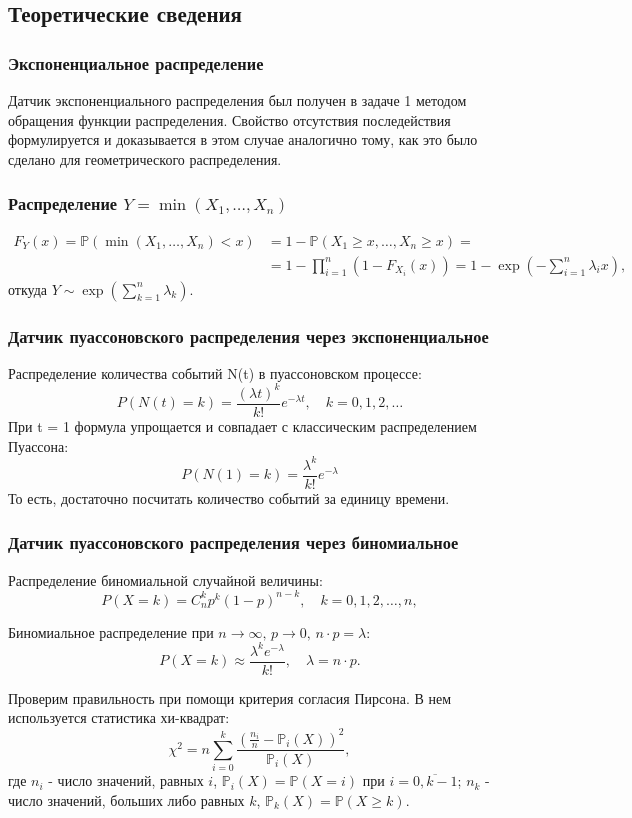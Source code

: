 \documentclass[11pt]{article}
\renewcommand{\ge}{\geqslant}
\begin{document}
\subsection{Теоретические сведения}
\subsubsection{Экспоненциальное распределение}
Датчик экспоненциального распределения был получен в задаче 1 методом обращения функции распределения. Свойство отсутствия последействия формулируется и доказывается в этом случае аналогично тому, как это было сделано для геометрического
распределения.
\subsubsection{Распределение $Y = \min(X_1, \dots, X_n)$}
\begin{equation*}
\begin{aligned}
F_Y(x) = \mathbb{P}(\min(X_1, \dots, X_n) < x) &= 1 - \mathbb{P}(X_1 \ge x, \dots, X_n \ge x) = \\
&= 1 - \prod_{i=1}^n (1 - F_{X_i}(x)) = 1 - \exp \left( -\sum_{i=1}^n \lambda_i x \right),
\end{aligned}
\end{equation*}
откуда $Y \sim \exp \left( \sum_{k=1}^n \lambda_k \right)$.
\subsubsection{Датчик пуассоновского распределения через экспоненциальное}
Распределение количества событий N(t) в пуассоновском процессе:
$$
P(N(t) = k) = \frac{(\lambda t)^k}{k!} e^{-\lambda t}, \quad k = 0, 1, 2, \dots
$$
При t = 1 формула упрощается и совпадает с классическим распределением Пуассона:
$$
P(N(1) = k) = \frac{\lambda^k}{k!} e^{-\lambda}
$$
То есть, достаточно посчитать количество событий за единицу времени.
\subsubsection{Датчик пуассоновского распределения через биномиальное}
Распределение биномиальной случайной величины:
$$
P(X = k) = C_n^k p^k (1 - p)^{n-k}, \quad k = 0, 1, 2, \dots, n,
$$

Биномиальное распределение при $ n \to \infty, \, p \to 0, \, n \cdot p = \lambda $:
$$
P(X = k) \approx \frac{\lambda^k e^{-\lambda}}{k!}, \quad \lambda = n \cdot p.
$$

Проверим правильность при помощи критерия согласия Пирсона. В нем используется статистика хи-квадрат:
$$
\chi^2 = n \sum_{i = 0}^k \frac{(\frac{n_i}{n} - \mathbb{P}_i(X))^2}{\mathbb{P}_i(X)},
$$
где $n_i$ - число значений, равных $i$, $\mathbb{P}_i(X) = \mathbb{P}(X = i)$ при $i = \overline{0,k-1}$; $n_k$ - число значений, больших либо равных $k$, $\mathbb{P}_k(X) = \mathbb{P}(X \ge k)$.
\end{document}
